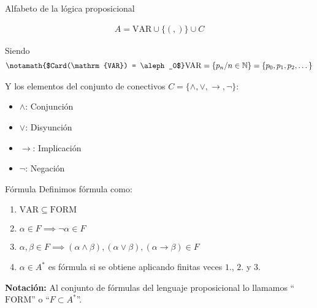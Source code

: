 %
\begin{definicion}{Alfabeto de la lógica proposicional}{}
    
    \begin{gather*}
        A = \mathrm{VAR} \cup \{ (, ) \} \cup C
    \end{gather*}

    Siendo
    \begin{gather*}
        \notamath{$Card(\mathrm{VAR}) = \aleph_0$}
        \mathrm{VAR} = \{ p_n / n \in \mathbb{N} \} = \{ p_0, p_1, p_2, \dots \}
    \end{gather*}

    \medskip

    Y los elementos del conjunto de conectivos 
    $C = \{ \wedge, \vee, \to, \neg \} $: 
    \begin{itemize}
        \item $\wedge$: Conjunción
        \item $\vee$: Disyunción
        \item $\to$: Implicación
        \item $\neg$: Negación
    \end{itemize}
    
\end{definicion}

\bigskip 

\begin{definicion}{Fórmula}{}
    Definimos fórmula como:

    \begin{enumerate}
        \item $\mathrm{VAR} \subseteq \mathrm{FORM}$
        \item $\alpha \in F \implies \neg \alpha \in F$
        \item $\alpha, \beta \in F \implies (\alpha \wedge \beta), 
            (\alpha \vee \beta), (\alpha \to \beta) \in F$
        \item $\alpha \in A^{*}$ es fórmula si se obtiene aplicando 
            finitas veces $1.$, $2.$ y $3.$
    \end{enumerate}

    \bigskip
    \textbf{Notación:}
    Al conjunto de fórmulas del lenguaje proposicional lo llamamos 
    ``$\mathrm{FORM}$'' o ``$F \subset A^{*}$''.
\end{definicion}

